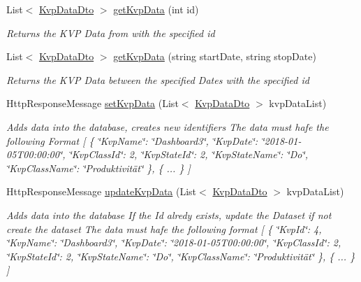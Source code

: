 \begin{DoxyCompactItemize}
List$<$ \hyperlink{classkpi_mvc_api_1_1_data_transfer_objects_1_1_kvp_data_dto}{Kvp\+Data\+Dto} $>$ \hyperlink{classkpi_mvc_api_1_1_controllers_1_1_kpidata_controller_a1dc630ba17a33a597ff3ecfb67ec8497}{get\+Kvp\+Data} (int id)
\begin{DoxyCompactList}\small\item\em Returns the K\+VP Data from with the specified id \end{DoxyCompactList}\item 
List$<$ \hyperlink{classkpi_mvc_api_1_1_data_transfer_objects_1_1_kvp_data_dto}{Kvp\+Data\+Dto} $>$ \hyperlink{classkpi_mvc_api_1_1_controllers_1_1_kpidata_controller_abcc1190cc0eb07ddb510bb47052cef58}{get\+Kvp\+Data} (string start\+Date, string stop\+Date)
\begin{DoxyCompactList}\small\item\em Returns the K\+VP Data between the specified Dates with the specified id \end{DoxyCompactList}\item 
Http\+Response\+Message \hyperlink{classkpi_mvc_api_1_1_controllers_1_1_kpidata_controller_aaed21921287f9a780cc3ff7e1042dc2a}{set\+Kvp\+Data} (List$<$ \hyperlink{classkpi_mvc_api_1_1_data_transfer_objects_1_1_kvp_data_dto}{Kvp\+Data\+Dto} $>$ kvp\+Data\+List)
\begin{DoxyCompactList}\small\item\em Adds data into the database, creates new identifiers The data must hafe the following Format \mbox{[} \{ \char`\"{}\+Kvp\+Name\char`\"{}\+: \char`\"{}\+Dashboard3\char`\"{}, \char`\"{}\+Kvp\+Date\char`\"{}\+: \char`\"{}2018-\/01-\/05\+T00\+:00\+:00\char`\"{}, \char`\"{}\+Kvp\+Class\+Id\char`\"{}\+: 2, \char`\"{}\+Kvp\+State\+Id\char`\"{}\+: 2, \char`\"{}\+Kvp\+State\+Name\char`\"{}\+: \char`\"{}\+Do\char`\"{}, \char`\"{}\+Kvp\+Class\+Name\char`\"{}\+: \char`\"{}\+Produktivität\char`\"{} \}, \{ ... \} \mbox{]} \end{DoxyCompactList}\item 
Http\+Response\+Message \hyperlink{classkpi_mvc_api_1_1_controllers_1_1_kpidata_controller_ac165b3dedfa1744a41af6a1acc07a657}{update\+Kvp\+Data} (List$<$ \hyperlink{classkpi_mvc_api_1_1_data_transfer_objects_1_1_kvp_data_dto}{Kvp\+Data\+Dto} $>$ kvp\+Data\+List)
\begin{DoxyCompactList}\small\item\em Adds data into the database If the Id alredy exists, update the Dataset if not create the dataset The data must hafe the following format \mbox{[} \{ \char`\"{}\+Kvp\+Id\char`\"{}\+: 4, \char`\"{}\+Kvp\+Name\char`\"{}\+: \char`\"{}\+Dashboard3\char`\"{}, \char`\"{}\+Kvp\+Date\char`\"{}\+: \char`\"{}2018-\/01-\/05\+T00\+:00\+:00\char`\"{}, \char`\"{}\+Kvp\+Class\+Id\char`\"{}\+: 2, \char`\"{}\+Kvp\+State\+Id\char`\"{}\+: 2, \char`\"{}\+Kvp\+State\+Name\char`\"{}\+: \char`\"{}\+Do\char`\"{}, \char`\"{}\+Kvp\+Class\+Name\char`\"{}\+: \char`\"{}\+Produktivität\char`\"{} \}, \{ ... \} \mbox{]} \end{DoxyCompactList}\item 

\end{DoxyCompactItemize}
